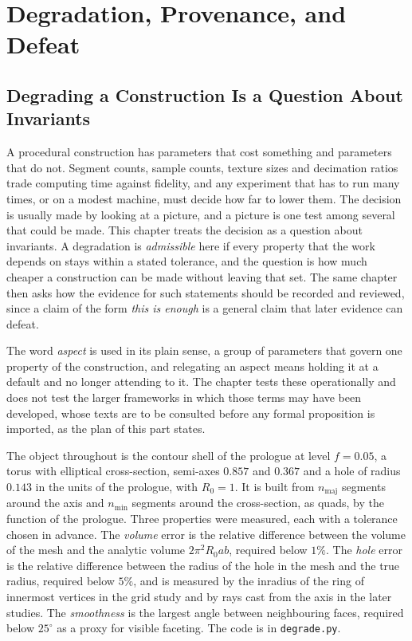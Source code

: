 \chapter{Degradation, Provenance, and Defeat}

\section{Degrading a Construction Is a Question About Invariants}

A procedural construction has parameters that cost something and parameters that do not. Segment counts, sample counts, texture sizes and decimation ratios trade computing time against fidelity, and any experiment that has to run many times, or on a modest machine, must decide how far to lower them. The decision is usually made by looking at a picture, and a picture is one test among several that could be made. This chapter treats the decision as a question about invariants. A degradation is \emph{admissible} here if every property that the work depends on stays within a stated tolerance, and the question is how much cheaper a construction can be made without leaving that set. The same chapter then asks how the evidence for such statements should be recorded and reviewed, since a claim of the form \emph{this is enough} is a general claim that later evidence can defeat.

The word \emph{aspect} is used in its plain sense, a group of parameters that govern one property of the construction, and relegating an aspect means holding it at a default and no longer attending to it. The chapter tests these operationally and does not test the larger frameworks in which those terms may have been developed, whose texts are to be consulted before any formal proposition is imported, as the plan of this part states.

The object throughout is the contour shell of the prologue at level $f=0.05$, a torus with elliptical cross-section, semi-axes $0.857$ and $0.367$ and a hole of radius $0.143$ in the units of the prologue, with $R_0=1$. It is built from $n_{\mathrm{maj}}$ segments around the axis and $n_{\mathrm{min}}$ segments around the cross-section, as quads, by the function of the prologue. Three properties were measured, each with a tolerance chosen in advance. The \emph{volume} error is the relative difference between the volume of the mesh and the analytic volume $2\pi^2R_0ab$, required below $1\%$. The \emph{hole} error is the relative difference between the radius of the hole in the mesh and the true radius, required below $5\%$, and is measured by the inradius of the ring of innermost vertices in the grid study and by rays cast from the axis in the later studies. The \emph{smoothness} is the largest angle between neighbouring faces, required below $25^{\circ}$ as a proxy for visible faceting. The code is in \texttt{degrade.py}.

